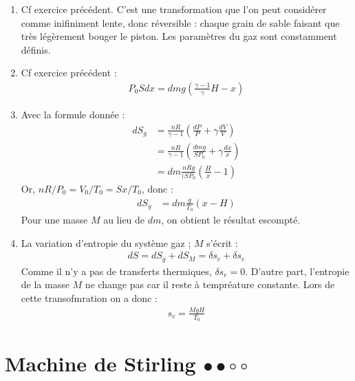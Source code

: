\begin{correction}

\begin{enumerate}

\item Cf exercice précédent. C'est une transformation que l'on peut considérer comme inifiniment lente, donc réversible : chaque grain de sable faisant que très légèrement bouger le piston. Les paramètres du gaz sont constamment définis.

\item Cf exercice précédent :
\begin{align*}
P_0Sdx=dmg\left(\frac{\gamma-1}{\gamma}H-x \right) 
\end{align*}

\item Avec la formule donnée :
\begin{align*}
	dS_g&=\frac{nR}{\gamma-1}\left(\frac{dP}{P}+\gamma\frac{dV}{V} \right) \\
	&=\frac{nR}{\gamma-1}\left(\frac{dmg}{SP_0}+\gamma\frac{dx}{x} \right) \\
	&=dm\frac{nRg}{(SP_0}\left(\frac{H}{x}-1 \right)
\end{align*}
Or, $nR/P_0=V_0/T_0=Sx/T_0$, donc :
\begin{align*}
	dS_g&=dm\frac{g}{T_0}(x-H)
\end{align*}
Pour une masse $M$ au lieu de $dm$, on obtient le résultat escompté. 

\item La variation d'entropie du système {gaz ; $M$} s'écrit :
\begin{align*}
	dS = dS_g+dS_M=\delta s_c + \delta s_e
\end{align*}
Comme il n'y a pas de transferts thermiques, $\delta s_e=0$. D'autre part, l'entropie de la masse $M$ ne change pas car il reste à tempréature constante. Lors de cette transofmration on a donc :
\begin{align*}
	s_c=\frac{MgH}{T_0}
\end{align*} 

\end{enumerate}

\end{correction}

\newpage

\section{Machine de Stirling $\bullet\bullet\circ\circ$}

